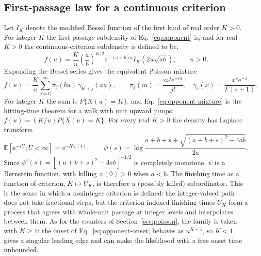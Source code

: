\documentclass[12pt]{article}
\newcommand{\e}{\mathrm{e}}
\newcommand{\E}{\mathbb{E}}
\theoremstyle{definition}
\theoremstyle{plain}
\theoremstyle{remark}
\begin{document}
\subsection{First-passage law for a continuous criterion}
Let $I_K$ denote the modified Bessel function of the first kind of real order $K>0$. For integer $K$ the first-passage subdensity of Eq.~\eqref{eq:opponent} is, and for real $K>0$ the continuous-criterion subdensity is defined to be,
\begin{equation}
 f(u)=\frac Ku\left(\frac ab\right)^{K/2}\e^{-(a+b)u}I_K\!\left(2u\sqrt{ab}\right),\qquad u>0.\label{eq:opponent-density}
\end{equation}
Expanding the Bessel series gives the equivalent Poisson mixture
\begin{equation}
 f(u)=\frac Ku\sum_{j=0}^\infty\pi_j(bu)\,\gamma_{K+j}(au),\qquad
 \pi_j(m)=\frac{m^j\e^{-m}}{j!},\quad
 \gamma_s(x)=\frac{x^s\e^{-x}}{\Gamma(s+1)}.\label{eq:opponent-mixture}
\end{equation}
For integer $K$ the sum is $P\{X(u)=K\}$, and Eq.~\eqref{eq:opponent-mixture} is the hitting-time theorem for a walk with unit upward jumps: $f(u)=(K/u)P\{X(u)=K\}$. For every real $K>0$ the density has Laplace transform
\begin{equation}
 \E\!\left[\e^{-sU};U<\infty\right]=\e^{-K\psi(s)},\qquad
 \psi(s)=\log\frac{a+b+s+\sqrt{(a+b+s)^2-4ab}}{2a}.\label{eq:opponent-laplace}
\end{equation}
Since $\psi'(s)=[(a+b+s)^2-4ab]^{-1/2}$ is completely monotone, $\psi$ is a Bernstein function, with killing $\psi(0)>0$ when $a<b$. The finishing time as a function of criterion, $K\mapsto U_K$, is therefore a (possibly killed) subordinator. This is the sense in which a noninteger criterion is defined: the integer-valued path does not take fractional steps, but the criterion-indexed finishing times $U_K$ form a process that agrees with whole-unit passage at integer levels and interpolates between them. As for the counters of Section~\ref{sec:poisson}, the family is taken with $K\geq1$: the onset of Eq.~\eqref{eq:opponent-onset} behaves as $u^{K-1}$, so $K<1$ gives a singular leading edge and can make the likelihood with a free onset time unbounded.
\end{document}
